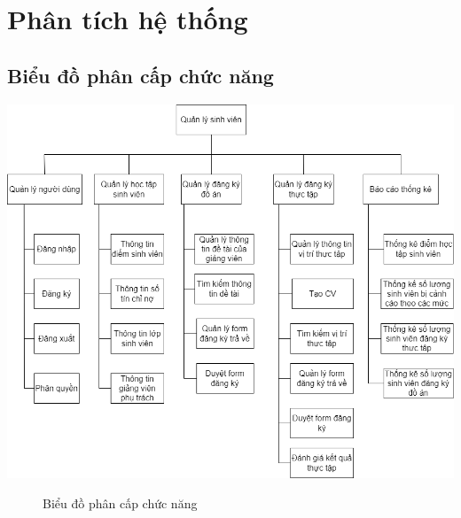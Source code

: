 \chapter{Phân tích hệ thống}
  \section{Biểu đồ phân cấp chức năng}
    \begin{center}
      \includegraphics[width=1.05\textwidth]{../drawio/bdpccn.png}
      \begin{figure}
        \centering
        \caption{Biểu đồ phân cấp chức năng}
      \end{figure}
    \end{center}

